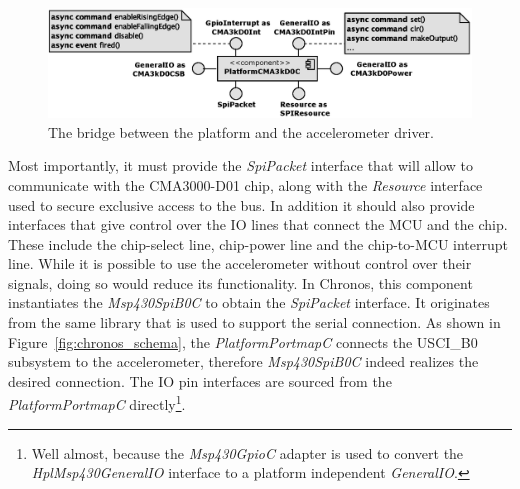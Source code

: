 \begin{figure}[h]
  \centering
  \includegraphics[width=1.0\textwidth]{diagrams/platform_cma3kd0_c.eps}
  \caption{The bridge between the platform and the accelerometer driver.}
  \label{fig:platform_cma3kd0_c}
\end{figure}
Most importantly, it must provide the \emph{SpiPacket} interface that will allow to communicate with the CMA3000-D01 chip, along with the \emph{Resource} interface used to secure exclusive access to the bus. In addition it should also provide interfaces that give control over the IO lines that connect the MCU and the chip. These include the chip-select line, chip-power line and the chip-to-MCU interrupt line. While it is possible to use the accelerometer without control over their signals, doing so would reduce its functionality. In Chronos, this component instantiates the \emph{Msp430SpiB0C} to obtain the \emph{SpiPacket} interface. It originates from the same library that is used to support the serial connection. As shown in Figure~\ref{fig:chronos_schema}, the \emph{PlatformPortmapC} connects the USCI\_B0 subsystem to the accelerometer, therefore \emph{Msp430SpiB0C} indeed realizes the desired connection. The IO pin interfaces are sourced from the \emph{PlatformPortmapC} directly\footnote{Well almost, because the \emph{Msp430GpioC} adapter is used to convert the \emph{HplMsp430GeneralIO} interface to a platform independent \emph{GeneralIO}.}.

